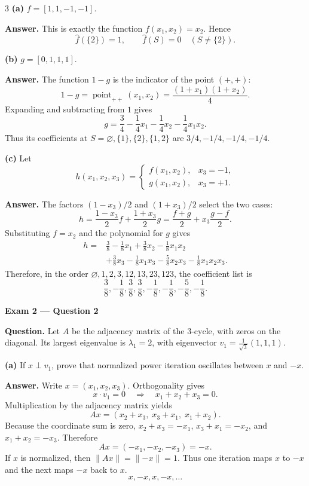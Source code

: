 \documentclass[10pt]{article}
\newcommand{\examlabel}[1]{%
  \par\noindent\textbf{#1}\par\vspace{1pt}}
\newcommand{\question}[1]{\par\noindent\textbf{Question.} #1\par}
\newcommand{\answer}{\par\noindent\textbf{Answer.} }
\begin{document}
\begin{multicols*}{3}
\textbf{(a)} $f=[1,1,-1,-1]$.

\answer This is exactly the function $f(x_1,x_2)=x_2$.  Hence
\[
  \widehat f(\{2\})=1,
  \qquad
  \widehat f(S)=0\quad(S\neq\{2\}).
\]

\textbf{(b)} $g=[0,1,1,1]$.

\answer The function $1-g$ is the indicator of the point $(+,+)$:
\[
  1-g
  =\operatorname{point}_{++}(x_1,x_2)
  =\frac{(1+x_1)(1+x_2)}4.
\]
Expanding and subtracting from $1$ gives
\[
  \boxed{
  g=\frac34-\frac14x_1-\frac14x_2-\frac14x_1x_2}.
\]
Thus its coefficients at
$S=\varnothing,\{1\},\{2\},\{1,2\}$ are
$3/4,-1/4,-1/4,-1/4$.

\textbf{(c)} Let
\[
  h(x_1,x_2,x_3)=
  \begin{cases}
    f(x_1,x_2),&x_3=-1,\\
    g(x_1,x_2),&x_3=+1.
  \end{cases}
\]

\answer The factors $(1-x_3)/2$ and $(1+x_3)/2$ select the two cases:
\[
  h=\frac{1-x_3}{2}f+\frac{1+x_3}{2}g
   =\frac{f+g}{2}+x_3\frac{g-f}{2}.
\]
Substituting $f=x_2$ and the polynomial for $g$ gives
\[
\boxed{
\begin{aligned}
h={}&\frac38-\frac18x_1+\frac38x_2-\frac18x_1x_2\\
 &+\frac38x_3-\frac18x_1x_3-\frac58x_2x_3
   -\frac18x_1x_2x_3 .
\end{aligned}}
\]
Therefore, in the order
$\varnothing,1,2,3,12,13,23,123$, the coefficient list is
\[
  \boxed{\frac38,-\frac18,\frac38,\frac38,
  -\frac18,-\frac18,-\frac58,-\frac18}.
\]

\examlabel{Exam 2 --- Question 2}
\question{Let $A$ be the adjacency matrix of the 3-cycle, with zeros on the
diagonal. Its largest eigenvalue is $\lambda_1=2$, with eigenvector
$v_1=\frac1{\sqrt3}(1,1,1)$.}

\textbf{(a)} If $x\perp v_1$, prove that normalized power iteration
oscillates between $x$ and $-x$.

\answer Write $x=(x_1,x_2,x_3)$. Orthogonality gives
\[
  x\cdot v_1=0
  \quad\Longrightarrow\quad
  x_1+x_2+x_3=0.
\]
Multiplication by the adjacency matrix yields
\[
  Ax=(x_2+x_3,\;x_3+x_1,\;x_1+x_2).
\]
Because the coordinate sum is zero,
$x_2+x_3=-x_1$, $x_3+x_1=-x_2$, and
$x_1+x_2=-x_3$. Therefore
\[
  Ax=(-x_1,-x_2,-x_3)=-x.
\]
If $x$ is normalized, then $\lVert Ax\rVert=\lVert-x\rVert=1$.
Thus one iteration maps $x$ to $-x$ and the next maps $-x$ back to $x$.
\[
  \boxed{x,-x,x,-x,\ldots}
\]


\end{multicols*}
\end{document}
